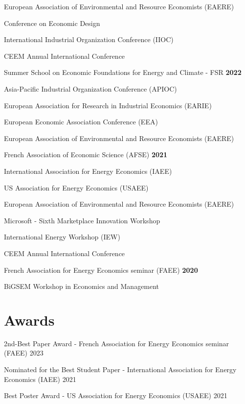 \documentclass[letterpaper]{article}
\begin{document}
European Association of Environmental and Resource Economists (EAERE)

Conference on Economic Design

International Industrial Organization Conference (IIOC)

CEEM Annual International Conference


\vspace{0.5cm}

Summer School on Economic Foundations for Energy and Climate - FSR \hfill \hfill  \textbf{2022}

Asia-Pacific Industrial Organization Conference (APIOC)

European Association for Research in Industrial Economics (EARIE)

European Economic Association Conference (EEA)

European Association of Environmental and Resource Economists (EAERE)

\vspace{0.5cm}

French Association of Economic Science (AFSE) \hfill \hfill \textbf{2021}

International Association for Energy Economics (IAEE) 

US Association for Energy Economics (USAEE)

European Association of Environmental and Resource Economists (EAERE)

Microsoft - Sixth Marketplace Innovation Workshop

International Energy Workshop (IEW)

CEEM Annual International Conference

\vspace{0.5cm}

French Association for Energy Economics seminar (FAEE)  \hfill \hfill \textbf{2020}

BiGSEM Workshop in Economics and Management


\section*{\textbf{Awards}}

2nd-Best Paper Award - French Association for Energy Economics seminar (FAEE) \hfill \hfill 2023

Nominated for the Best Student Paper - International Association for Energy Economics (IAEE) \hfill \hfill 2021

Best Poster Award - US Association for Energy Economics (USAEE) \hfill \hfill 2021
\end{document}
